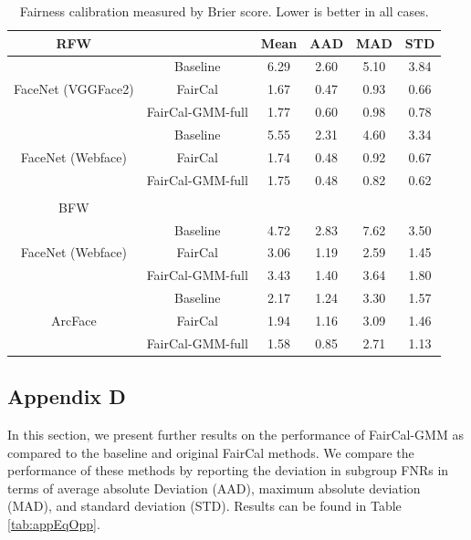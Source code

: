 \begin{table}
\centering
\footnotesize
\begin{tabular}{c c cccc}
\toprule
RFW && Mean & AAD & MAD & STD \\
\midrule
\multirow{3}{5em}{FaceNet (VGGFace2)} 
& Baseline         &  6.29  &  2.60  &  5.10  &  3.84  \\
& FairCal          &  1.67  &  0.47  &  0.93  &  0.66  \\
& FairCal-GMM-full &  1.77  &  0.60  &  0.98  &  0.78  \\
\hline
\multirow{3}{5em}{FaceNet (Webface)}
& Baseline         &  5.55  &  2.31  &  4.60  &  3.34  \\
& FairCal          &  1.74  &  0.48  &  0.92  &  0.67  \\
& FairCal-GMM-full &  1.75  &  0.48  &  0.82  &  0.62  \\
\midrule
\\
BFW & & & & &  \\
\midrule
\multirow{3}{5em}{FaceNet (Webface)} 
& Baseline         &  4.72  &  2.83  &  7.62  &  3.50  \\
& FairCal          &  3.06  &  1.19  &  2.59  &  1.45  \\
& FairCal-GMM-full &  3.43  &  1.40  &  3.64  &  1.80  \\
\hline
\multirow{3}{5em}{ArcFace} 
& Baseline         &  2.17  &  1.24  &  3.30  &  1.57  \\
& FairCal          &  1.94  &  1.16  &  3.09  &  1.46  \\
& FairCal-GMM-full &  1.58  &  0.85  &  2.71  &  1.13  \\
\bottomrule
\end{tabular}
\caption{Fairness calibration measured by Brier score. Lower is better in all cases.}
\label{tab:Brier}
\end{table}

\subsection{Appendix D}
In this section, we present further results on the performance of FairCal-GMM as compared to the baseline and original FairCal methods. We compare the performance of these methods by reporting the deviation in subgroup FNRs in terms of average absolute Deviation (AAD), maximum absolute deviation (MAD), and standard deviation (STD). Results can be found in Table \ref{tab:appEqOpp}.

